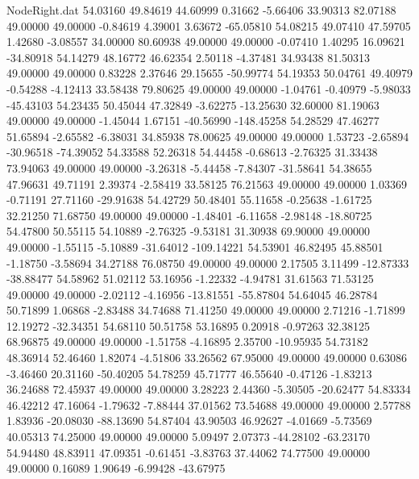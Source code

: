 \begin{filecontents}{NodeRight.dat}
  54.03160   49.84619   44.60999     0.31662   -5.66406   33.90313   82.07188   49.00000   49.00000   -0.84619    4.39001    3.63672  -65.05810
  54.08215   49.07410   47.59705     1.42680   -3.08557   34.00000   80.60938   49.00000   49.00000   -0.07410    1.40295   16.09621  -34.80918
  54.14279   48.16772   46.62354     2.50118   -4.37481   34.93438   81.50313   49.00000   49.00000    0.83228    2.37646   29.15655  -50.99774
  54.19353   50.04761   49.40979    -0.54288   -4.12413   33.58438   79.80625   49.00000   49.00000   -1.04761   -0.40979   -5.98033  -45.43103
  54.23435   50.45044   47.32849    -3.62275  -13.25630   32.60000   81.19063   49.00000   49.00000   -1.45044    1.67151  -40.56990 -148.45258
  54.28529   47.46277   51.65894    -2.65582   -6.38031   34.85938   78.00625   49.00000   49.00000    1.53723   -2.65894  -30.96518  -74.39052
  54.33588   52.26318   54.44458    -0.68613   -2.76325   31.33438   73.94063   49.00000   49.00000   -3.26318   -5.44458   -7.84307  -31.58641
  54.38655   47.96631   49.71191     2.39374   -2.58419   33.58125   76.21563   49.00000   49.00000    1.03369   -0.71191   27.71160  -29.91638
  54.42729   50.48401   55.11658    -0.25638   -1.61725   32.21250   71.68750   49.00000   49.00000   -1.48401   -6.11658   -2.98148  -18.80725
  54.47800   50.55115   54.10889    -2.76325   -9.53181   31.30938   69.90000   49.00000   49.00000   -1.55115   -5.10889  -31.64012 -109.14221
  54.53901   46.82495   45.88501    -1.18750   -3.58694   34.27188   76.08750   49.00000   49.00000    2.17505    3.11499  -12.87333  -38.88477
  54.58962   51.02112   53.16956    -1.22332   -4.94781   31.61563   71.53125   49.00000   49.00000   -2.02112   -4.16956  -13.81551  -55.87804
  54.64045   46.28784   50.71899     1.06868   -2.83488   34.74688   71.41250   49.00000   49.00000    2.71216   -1.71899   12.19272  -32.34351
  54.68110   50.51758   53.16895     0.20918   -0.97263   32.38125   68.96875   49.00000   49.00000   -1.51758   -4.16895    2.35700  -10.95935
  54.73182   48.36914   52.46460     1.82074   -4.51806   33.26562   67.95000   49.00000   49.00000    0.63086   -3.46460   20.31160  -50.40205
  54.78259   45.71777   46.55640    -0.47126   -1.83213   36.24688   72.45937   49.00000   49.00000    3.28223    2.44360   -5.30505  -20.62477
  54.83334   46.42212   47.16064    -1.79632   -7.88444   37.01562   73.54688   49.00000   49.00000    2.57788    1.83936  -20.08030  -88.13690
  54.87404   43.90503   46.92627    -4.01669   -5.73569   40.05313   74.25000   49.00000   49.00000    5.09497    2.07373  -44.28102  -63.23170
  54.94480   48.83911   47.09351    -0.61451   -3.83763   37.44062   74.77500   49.00000   49.00000    0.16089    1.90649   -6.99428  -43.67975

\end{filecontents}
